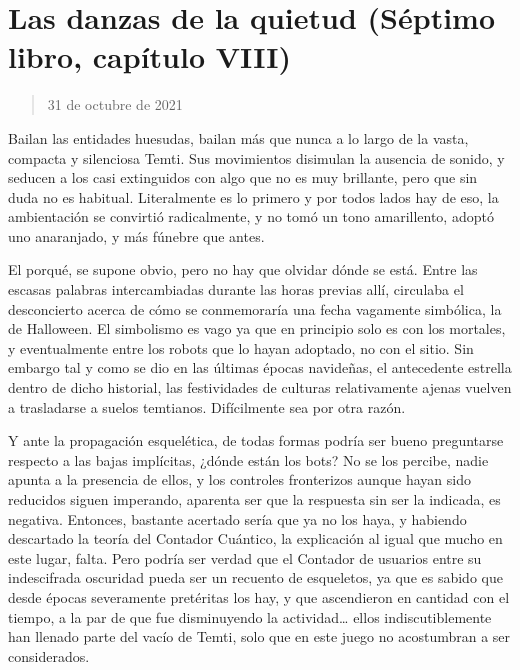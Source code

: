 \documentclass[
  spanish,
]{book}
\begin{document}
\hypertarget{las-danzas-de-la-quietud-suxe9ptimo-libro-capuxedtulo-viii}{%
\section{Las danzas de la quietud (Séptimo libro, capítulo VIII)}\label{las-danzas-de-la-quietud-suxe9ptimo-libro-capuxedtulo-viii}}

\begin{quote}
31 de octubre de 2021
\end{quote}

Bailan las entidades huesudas, bailan más que nunca a lo largo de la vasta, compacta y silenciosa Temti. Sus movimientos disimulan la ausencia de sonido, y seducen a los casi extinguidos con algo que no es muy brillante, pero que sin duda no es habitual. Literalmente es lo primero y por todos lados hay de eso, la ambientación se convirtió radicalmente, y no tomó un tono amarillento, adoptó uno anaranjado, y más fúnebre que antes.

El porqué, se supone obvio, pero no hay que olvidar dónde se está. Entre las escasas palabras intercambiadas durante las horas previas allí, circulaba el desconcierto acerca de cómo se conmemoraría una fecha vagamente simbólica, la de Halloween. El simbolismo es vago ya que en principio solo es con los mortales, y eventualmente entre los robots que lo hayan adoptado, no con el sitio. Sin embargo tal y como se dio en las últimas épocas navideñas, el antecedente estrella dentro de dicho historial, las festividades de culturas relativamente ajenas vuelven a trasladarse a suelos temtianos. Difícilmente sea por otra razón.

Y ante la propagación esquelética, de todas formas podría ser bueno preguntarse respecto a las bajas implícitas, ¿dónde están los bots? No se los percibe, nadie apunta a la presencia de ellos, y los controles fronterizos aunque hayan sido reducidos siguen imperando, aparenta ser que la respuesta sin ser la indicada, es negativa. Entonces, bastante acertado sería que ya no los haya, y habiendo descartado la teoría del Contador Cuántico, la explicación al igual que mucho en este lugar, falta. Pero podría ser verdad que el Contador de usuarios entre su indescifrada oscuridad pueda ser un recuento de esqueletos, ya que es sabido que desde épocas severamente pretéritas los hay, y que ascendieron en cantidad con el tiempo, a la par de que fue disminuyendo la actividad\ldots{} ellos indiscutiblemente han llenado parte del vacío de Temti, solo que en este juego no acostumbran a ser considerados.
\end{document}
